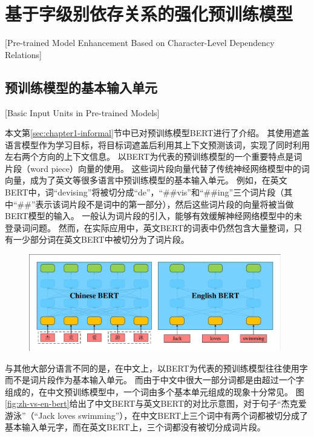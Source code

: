 \section{基于字级别依存关系的强化预训练模型}[Pre-trained Model Enhancement Based on Character-Level Dependency Relations]

\subsection{预训练模型的基本输入单元}[Basic Input Units in Pre-trained Models]

本文第\ref{sec:chapter1-informal}节中已对预训练模型BERT进行了介绍。
其使用遮盖语言模型作为学习目标，将目标词遮盖后利用其上下文预测该词，实现了同时利用左右两个方向的上下文信息。
以BERT为代表的预训练模型的一个重要特点是词片段（word piece）向量\cite{wu-etal-2016-google}的使用。
这些词片段向量代替了传统神经网络模型中的词向量，成为了英文等很多语言中预训练模型的基本输入单元。
例如，在英文BERT中，词“devising”将被切分成“de”，“\#\#vis”和“\#\#ing”三个词片段（其中“\#\#”表示该词片段不是词中的第一部分），然后这些词片段的向量将被当做BERT模型的输入。
一般认为词片段的引入，能够有效缓解神经网络模型中的未登录词问题。
然而，在实际应用中，英文BERT的词表中仍然包含大量整词，只有一少部分词在英文BERT中被切分为了词片段。

\begin{figure}[hbtp]
	\centering
	\includegraphics[width=0.98\textwidth]{figures/zh-vs-en-bert.pdf}
\end{figure}

与其他大部分语言不同的是，在中文上，以BERT为代表的预训练模型往往使用字而不是词片段作为基本输入单元。
而由于中文中很大一部分词都是由超过一个字组成的，在中文预训练模型中，一个词由多个基本单元组成的现象十分常见。
图\ref{fig:zh-vs-en-bert}给出了中文BERT与英文BERT的对比示意图，对于句子“杰克爱游泳”（“Jack loves swimming”），在中文BERT上三个词中有两个词都被切分成了基本输入单元字，而在英文BERT上，三个词都没有被切分成词片段。

